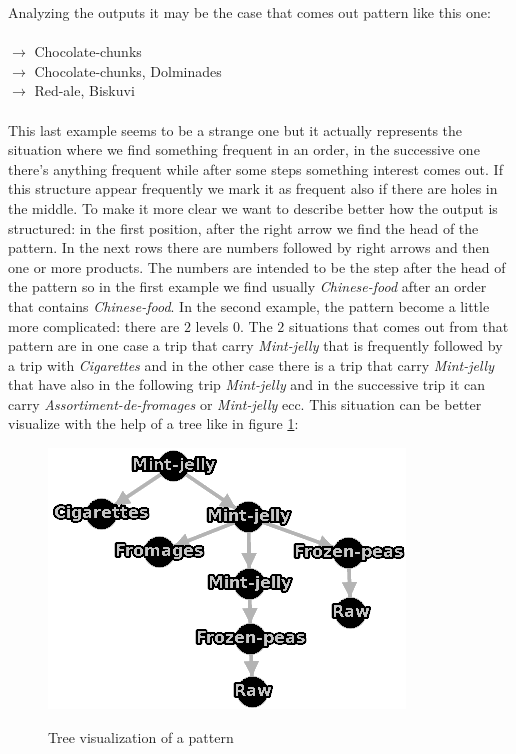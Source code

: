 \documentclass{acm_proc_article-sp-sigmod09}
\begin{document}
	Analyzing the outputs it may be the case that comes out pattern like this one:\\ \\
	\null \qquad \qquad $\rightarrow$ Chocolate-chunks\\
	\null \qquad \qquad {} $\rightarrow$ Chocolate-chunks, Dolminades \\
	\null \qquad \qquad \qquad \qquad {} $\rightarrow$ Red-ale, Biskuvi\\ \\
	This last example seems to be a strange one but it actually represents the situation where we find something frequent in an order, in the successive one there's anything frequent while after some steps something interest comes out. If this structure appear frequently we mark it as frequent also if there are holes in the middle.
	To make it more clear we want to describe better how the output is structured: in the first position, after the right arrow we find the head of the pattern. In the next rows there are numbers followed by right arrows and then one or more products. The numbers are intended to be the step after the head of the pattern so in the first example we find usually \textit{Chinese-food} after an order that contains \textit{Chinese-food}. In the second example, the pattern become a little more complicated: there are $2$ levels $0$. The $2$ situations that comes out from that pattern are in one case a trip that carry \textit{Mint-jelly} that is frequently followed by a trip with \textit{Cigarettes} and in the other case there is a trip that carry \textit{Mint-jelly} that have also in the following trip \textit{Mint-jelly} and in the successive trip it can carry \textit{Assortiment-de-fromages} or \textit{Mint-jelly} ecc.
	This situation can be better visualize with the help of a tree like in figure \ref{fig:tree}:
	\begin{figure}[h]
		\caption{Tree visualization of a pattern}
		\centering
		\includegraphics[scale=0.4]{tree.png}
		\label{fig:tree}
	\end{figure}
\end{document}
